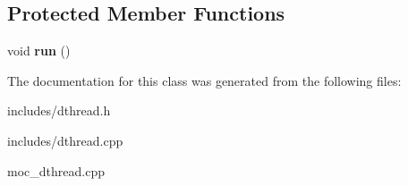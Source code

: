 \subsection*{Protected Member Functions}
\begin{DoxyCompactItemize}
\item 
\hypertarget{class_d_thread_a26a47da486d90f805cc39ccbf552e029}{
void {\bfseries run} ()}
\label{class_d_thread_a26a47da486d90f805cc39ccbf552e029}

\end{DoxyCompactItemize}


The documentation for this class was generated from the following files:\begin{DoxyCompactItemize}
\item 
includes/dthread.h\item 
includes/dthread.cpp\item 
moc\_\-dthread.cpp\end{DoxyCompactItemize}
